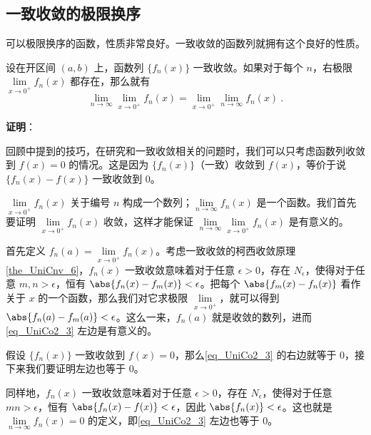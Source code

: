 \subsection{一致收敛的极限换序}

可以极限换序的函数，性质非常良好。一致收敛的函数列就拥有这个良好的性质。

\begin{theorem}{}\label{the_UniCo2_1}
设在开区间 $(a, b)$ 上，函数列 $\{f_n(x)\}$ 一致收敛。如果对于每个 $n$，右极限 $\lim\limits_{x\to 0^+}f_n(x)$ 都存在，那么就有
\begin{equation}\label{eq_UniCo2_3}
\lim\limits_{n\to\infty}\lim\limits_{x\to 0^+}f_n(x)=\lim\limits_{x\to 0^+}\lim\limits_{n\to\infty}f_n(x)~.
\end{equation}
\end{theorem}

\textbf{证明}：

回顾中提到的技巧，在研究和一致收敛相关的问题时，我们可以只考虑函数列收敛到 $f(x)=0$ 的情况。这是因为 $\{f_n(x)\}$（一致）收敛到 $f(x)$，等价于说 $\{f_n(x)-f(x)\}$ 一致收敛到 $0$。

$\lim\limits_{x\to 0^+}f_n(x)$ 关于编号 $n$ 构成一个数列；$\lim\limits_{n\to\infty}f_n(x)$ 是一个函数。我们首先要证明 $\lim\limits_{x\to 0^+}f_n(x)$ 收敛，这样才能保证 $\lim\limits_{n\to\infty}\lim\limits_{x\to 0^+}f_n(x)$ 是有意义的。

首先定义 $f_n(a)=\lim\limits_{x\to 0^+}f_n(x)$。考虑一致收敛的柯西收敛原理\autoref{the_UniCnv_6}，$f_n(x)$ 一致收敛意味着对于任意 $\epsilon>0$，存在 $N_\epsilon$，使得对于任意 $m, n>\epsilon$，恒有 $\abs{f_n(x)-f_m(x)}<\epsilon$。把每个 $\abs{f_m(x)-f_n(x)}$ 看作关于 $x$ 的一个函数，那么我们对它求极限 $\lim\limits_{x\to 0^+}$，就可以得到 $\abs{f_n(a)-f_m(a)}<\epsilon$。这么一来，$f_n(a)$ 就是收敛的数列，进而\autoref{eq_UniCo2_3} 左边是有意义的。

假设 $\{f_n(x)\}$ 一致收敛到 $f(x)=0$，那么\autoref{eq_UniCo2_3} 的右边就等于 $0$，接下来我们要证明左边也等于 $0$。

同样地，$f_n(x)$ 一致收敛意味着对于任意 $\epsilon>0$，存在 $N_\epsilon$，使得对于任意 $mn>\epsilon$，恒有 $\abs{f_n(x)-f(x)}<\epsilon$，因此 $\abs{f_n(x)}<\epsilon$。这也就是 $\lim\limits_{n\to\infty}f_n(x)=0$ 的定义，即\autoref{eq_UniCo2_3} 左边也等于 $0$。


